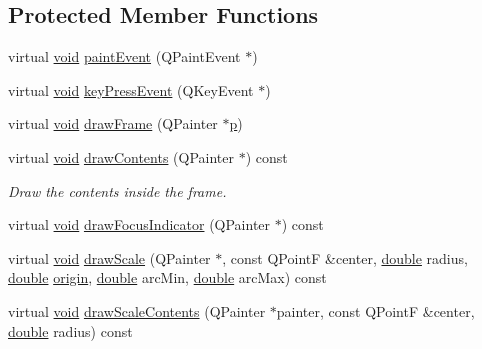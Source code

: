 \subsection*{Protected Member Functions}
\begin{DoxyCompactItemize}
\item 
virtual \hyperlink{group___u_a_v_objects_plugin_ga444cf2ff3f0ecbe028adce838d373f5c}{void} \hyperlink{class_qwt_dial_a11e50d714b9decb0f5d34e5acdde970d}{paint\-Event} (Q\-Paint\-Event $\ast$)
\item 
virtual \hyperlink{group___u_a_v_objects_plugin_ga444cf2ff3f0ecbe028adce838d373f5c}{void} \hyperlink{class_qwt_dial_a61a2341a76abc20ea5bd72a0485be136}{key\-Press\-Event} (Q\-Key\-Event $\ast$)
\item 
virtual \hyperlink{group___u_a_v_objects_plugin_ga444cf2ff3f0ecbe028adce838d373f5c}{void} \hyperlink{class_qwt_dial_ad4534ebd8e4a792edbad3e16c25be7ca}{draw\-Frame} (Q\-Painter $\ast$\hyperlink{glext_8h_aa5367c14d90f462230c2611b81b41d23}{p})
\item 
virtual \hyperlink{group___u_a_v_objects_plugin_ga444cf2ff3f0ecbe028adce838d373f5c}{void} \hyperlink{class_qwt_dial_a9c567a9ce20120f3094a3d21ad26874a}{draw\-Contents} (Q\-Painter $\ast$) const 
\begin{DoxyCompactList}\small\item\em Draw the contents inside the frame. \end{DoxyCompactList}\item 
virtual \hyperlink{group___u_a_v_objects_plugin_ga444cf2ff3f0ecbe028adce838d373f5c}{void} \hyperlink{class_qwt_dial_a1fce41a19c2e368fe90551e29c4de076}{draw\-Focus\-Indicator} (Q\-Painter $\ast$) const 
\item 
virtual \hyperlink{group___u_a_v_objects_plugin_ga444cf2ff3f0ecbe028adce838d373f5c}{void} \hyperlink{class_qwt_dial_ac813529114f5d0ab9a2619fe9c43c58a}{draw\-Scale} (Q\-Painter $\ast$, const Q\-Point\-F \&center, \hyperlink{_super_l_u_support_8h_a8956b2b9f49bf918deed98379d159ca7}{double} radius, \hyperlink{_super_l_u_support_8h_a8956b2b9f49bf918deed98379d159ca7}{double} \hyperlink{ioapi_8h_a6ad5e17860121e666df109329b95c83e}{origin}, \hyperlink{_super_l_u_support_8h_a8956b2b9f49bf918deed98379d159ca7}{double} arc\-Min, \hyperlink{_super_l_u_support_8h_a8956b2b9f49bf918deed98379d159ca7}{double} arc\-Max) const 
\item 
virtual \hyperlink{group___u_a_v_objects_plugin_ga444cf2ff3f0ecbe028adce838d373f5c}{void} \hyperlink{class_qwt_dial_a06b36d64377e54dac8812b4c4c0bf263}{draw\-Scale\-Contents} (Q\-Painter $\ast$painter, const Q\-Point\-F \&center, \hyperlink{_super_l_u_support_8h_a8956b2b9f49bf918deed98379d159ca7}{double} radius) const 

\end{DoxyCompactItemize}

